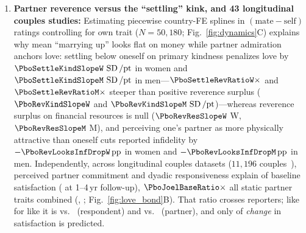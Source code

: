\begin{enumerate}[leftmargin=1.4em,itemsep=1.5pt,topsep=2pt]
\item \textbf{Partner reverence versus the ``settling'' kink, and 43 longitudinal couples studies:} Estimating piecewise country-FE splines in $(\text{mate}-\text{self})$ ratings controlling for own trait ($N=50{,}180$; Fig.~\ref{fig:dynamics}C) explains why mean ``marrying up'' looks flat on money while partner admiration anchors love: settling below oneself on primary kindness penalizes love by $\PboSettleKindSlopeW\,\SD/\mathrm{pt}$ in women and $\PboSettleKindSlopeM\,\SD/\mathrm{pt}$ in men---$\PboSettleRevRatioW\times$ and $\PboSettleRevRatioM\times$ steeper than positive reverence surplus ($\PboRevKindSlopeW$ and $\PboRevKindSlopeM\,\SD/\mathrm{pt}$)---whereas reverence surplus on financial resources is null ($\PboRevResSlopeW$ W, $\PboRevResSlopeM$ M), and perceiving one's partner as more physically attractive than oneself cuts reported infidelity by $-\PboRevLooksInfDropW\,\mathrm{pp}$ in women and $-\PboRevLooksInfDropM\,\mathrm{pp}$ in men. Independently, across \PboJoelDatasetsN{} longitudinal couples datasets ($11{,}196$ couples~\cite{joel2020}), perceived partner commitment and dyadic responsiveness explain \PboJoelRelBaseRTwo{} of baseline satisfaction (\PboJoelRelFollowRTwo{} at 1--4\,yr follow-up), $\PboJoelBaseRatio\times$ all static partner traits combined (\PboJoelTraitBaseRTwo{}, \PboJoelTraitFollowRTwo{}; Fig.~\ref{fig:love_bond}B). That ratio crosses reporters; like for like it is \PboJoelRelBaseRTwo{} vs.\ \PboJoelActorTraitBaseRTwo{} (respondent) and \PboJoelPartnerRelBaseRTwo{} vs.\ \PboJoelTraitBaseRTwo{} (partner), and only \PboJoelRelChangeRTwo{} of \emph{change} in satisfaction is predicted.

\end{enumerate}
